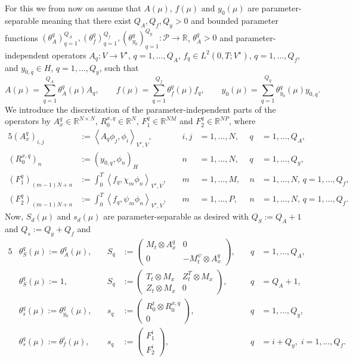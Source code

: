 \documentclass{article}
\theoremstyle{plain}
\theoremstyle{definition}
\theoremstyle{remark}
\newcommand{\RR}{\mathbb{R}}
\begin{document}
For this we from now on assume that $A(\mu)$, $f(\mu)$ and $y_0(\mu)$ are parameter-separable meaning that there exist $Q_A, Q_f, Q_y >0$ and bounded parameter functions $(\theta^{q}_{A})_{q=1}^{Q_A}, (\theta^{q}_{f})_{q=1}^{Q_f}, (\theta^{q}_{y_{0}})_{q=1}^{Q_y} : \mathcal{P} \rightarrow \mathbb{R}$, $\theta^{q}_{A} > 0$ and parameter-independent operators $A_{q} : V \rightarrow V^\star$, $q=1,...,Q_A$, $f_{q} \in L^2(0,T; V^\star)$, $q=1,...,Q_f$, and $y_{0,q} \in H$, $q=1,...,Q_y$, such that 
\begin{equation}
A(\mu) = \sum_{q=1}^{Q_{A}} \theta^{q}_{A}(\mu) A_{q}, \qquad f(\mu) = \sum_{q=1}^{Q_{f}} \theta^{q}_{f}(\mu) f_{q}, \qquad y_0(\mu) = \sum_{q=1}^{Q_{y}} \theta^{q}_{y_{0}}(\mu) y_{0,q} .
\end{equation}
We introduce the discretization of the parameter-independent parts of the operators by $A_x^q \in \RR^{N\times N}$, $R_{0}^{x,q} \in \RR^N$, $F_{1}^q \in \RR^{NM}$ and $F_{2}^q \in \RR^{NP}$, where
\begin{alignat}{5}
\left(A_{x}^{q}\right)_{i,j} &:= \left\langle A_{q}\phi_{j}, \phi_{i} \right\rangle_{V^{\star}, V}, \qquad  &i,j &= 1, ..., N, \, &q &= 1, ..., Q_{A}, \\
\left(R_{0}^{x,q}\right)_{n} &:= (y_{0,q},\phi_n)_H  &n &= 1, ..., N, \, &q &= 1, ..., Q_{y}, \\
\left(F_{1}^q\right)_{(m-1)N+n} &:= 
\int_{0}^{T} \left\langle f_{q}, \chi_m\phi_{n} \right\rangle_{V^{\star}, V},\quad  &m &= 1, ..., M, \; &n &= 1, ..., N, \, q = 1, ..., Q_{f}, \\
\left(F_{2}^{q}\right)_{(m-1)N+n} &:= 
\int_{0}^{T} \left\langle f_{q}, \psi_m\phi_{n} \right\rangle_{V^{\star}, V},\quad &m &= 1, ..., P, \, &n &= 1, ..., N, \, q = 1, ..., Q_{f}.
\end{alignat}
Now, $S_d(\mu)$ and $s_d(\mu)$ are parameter-separable as desired with $Q_S := Q_A + 1$ and $Q_s := Q_{y} + Q_{f}$ and
\begin{alignat}{5}
    &\theta_S^q(\mu) := \theta_A^q(\mu), \quad &S_q &:= \begin{pmatrix} M_t \otimes A_x^q & 0 \\
    0 & -M_t^\psi \otimes A_x^q
    \end{pmatrix}, \quad & q &= 1, ..., Q_A , \\
    &\theta_S^q(\mu) := 1, \quad &S_q &:= \begin{pmatrix} T_t \otimes M_x & Z_t^T \otimes M_x \\
    Z_t \otimes M_x & 0
    \end{pmatrix}, \quad & q &= Q_A + 1 , \\
    &\theta_s^q(\mu) := \theta^{q}_{y_{0}}(\mu), \quad &s_q &:= \begin{pmatrix} R_0^t \otimes R_{0}^{x,q} \\ 0 \end{pmatrix}, \quad & q &= 1, ..., Q_y , \\
    &\theta_s^q(\mu) := \theta^{i}_{f}(\mu), \quad &s_q &:= \begin{pmatrix} F_{1}^i \\ F_{2}^i
    \end{pmatrix}, \quad & q &= i+ Q_y, \; i = 1, ..., Q_f .
\end{alignat}
\end{document}
